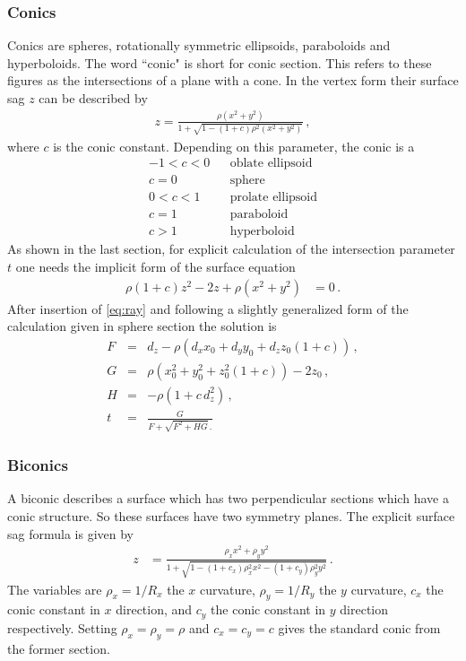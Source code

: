 \documentclass[12pt,a4paper,twoside,openright,BCOR10mm,headsepline,titlepage,abstracton,chapterprefix,final]{scrreprt}
\begin{document}
\subsubsection{Conics}
Conics are spheres, rotationally symmetric ellipsoids, paraboloids and hyperboloids.
The word ``conic" is short for conic section. This refers to these figures as the
intersections of a plane with a cone.
In the vertex form their surface sag $z$ can be described by
\begin{eqnarray}
 z =  \frac
 { \rho ( x^2 + y^2 ) }
 { 1 + \sqrt{1 - (1+c) \rho^2  (x^2 + y^2)} }\,,
\end{eqnarray}
where $c$ is the conic constant. Depending on this parameter, the conic is a
\begin{eqnarray*}
-1 < c < 0 && \textrm{oblate ellipsoid} \\
     c = 0 && \textrm{sphere} \\
 0 < c < 1 && \textrm{prolate ellipsoid} \\
     c = 1 && \textrm{paraboloid} \\
     c > 1 && \textrm{hyperboloid}
\end{eqnarray*}
As shown in the last section, for explicit calculation of the intersection parameter $t$ one
needs the implicit form of the surface equation
\begin{align}
 \rho (1 + c) z^2 - 2 z + \rho (x^2 + y^2) &=0\,.
\end{align}
After insertion of \eqref{eq:ray} and following a slightly generalized form of the calculation
given in sphere section the solution is
\begin{subequations}
\begin{eqnarray}
   F &=& d_z - \rho \left( d_x x_0 + d_y y_0 + d_z z_0 (1+c) \right)\,, \\
   G &=& \rho (x_0^2 + y_0^2 + z_0^2 (1+c)) - 2 z_0\,, \\
   H &=& - \rho ( 1 + c \, d_z^2 )\,, \\
   t &=& \frac{G}{ F + \sqrt{F^2 + H G}\,. }
\end{eqnarray}
\end{subequations}

\subsubsection{Biconics}
A biconic describes a surface which has two perpendicular sections
which have a conic structure. So these surfaces have two symmetry planes.
The explicit surface sag formula is given by
\begin{align}
 z &= \frac{\rho_x x^2 + \rho_y y^2}{1 + \sqrt{1 - (1+c_x) \rho_x^2 x^2 - (1+c_y) \rho_y^2 y^2}} \label{eq:biconic}\,.
\end{align}
The variables are $\rho_x = 1/R_x$ the $x$ curvature, $\rho_y = 1/R_y$ the $y$ curvature, $c_x$ the conic constant in $x$ direction,
and $c_y$ the conic constant in $y$ direction respectively. Setting $\rho_x = \rho_y = \rho$ and $c_x = c_y = c$ gives
the standard conic from the former section.
\end{document}
